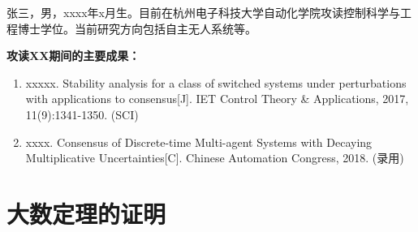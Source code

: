 \documentclass[master]{hdu-thesis}
\begin{document}
 






%
%

 \personalresult
 张三，男，xxxx年x月生。目前在杭州电子科技大学自动化学院攻读控制科学与工程博士学位。当前研究方向包括自主无人系统等。\\
 
 {\par\bfseries \noindent 攻读XX期间的主要成果：}
 \begin{enumerate}
  \item  xxxxx. \newblock Stability analysis for a class of switched systems under
perturbations with applications to consensus[J].
\newblock IET Control Theory \& Applications, 2017, 11(9):1341-1350. (SCI)
  \item xxxx.
\newblock Consensus of Discrete-time Multi-agent Systems with Decaying Multiplicative Uncertainties[C].
\newblock Chinese Automation Congress, 2018. (录用)
 \end{enumerate}





\thesisappendix

\chapter{大数定理的证明}
\end{document}
